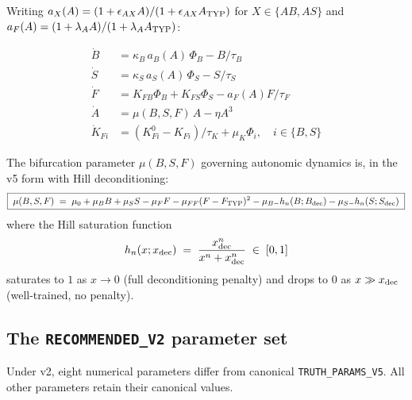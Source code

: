 \documentclass[11pt,a4paper]{article}
\theoremstyle{definition}
\begin{document}
Writing $a_X(A) = (1 + \epsilon_{AX} A)/(1 + \epsilon_{AX} A_{\rm TYP})$ for $X \in \{AB, AS\}$ and $a_F(A) = (1 + \lambda_A A)/(1 + \lambda_A A_{\rm TYP})$:

\begin{align}
\dot B   &= \kappa_B \, a_B(A) \, \Phi_B - B / \tau_B \label{eq:drift-B}\\
\dot S   &= \kappa_S \, a_S(A) \, \Phi_S - S / \tau_S \label{eq:drift-S}\\
\dot F   &= K_{FB} \Phi_B + K_{FS} \Phi_S - a_F(A) F / \tau_F \label{eq:drift-F}\\
\dot A   &= \mu(B, S, F) \, A - \eta A^3 \label{eq:drift-A}\\
\dot K_{Fi} &= (K_{Fi}^0 - K_{Fi}) / \tau_K + \mu_K \Phi_i, \quad i \in \{B, S\} \label{eq:drift-K}
\end{align}

The bifurcation parameter $\mu(B, S, F)$ governing autonomic dynamics is, in the v5 form with Hill deconditioning:
\begin{equation}
\boxed{\;
\mu(B, S, F) \;=\; \mu_0 + \mu_B B + \mu_S S - \mu_F F - \mu_{FF}(F - F_{\rm TYP})^2 - \mu_{B-} h_n(B; B_{\rm dec}) - \mu_{S-} h_n(S; S_{\rm dec})
\;}
\label{eq:mu}
\end{equation}
where the Hill saturation function
\begin{equation}
h_n(x; x_{\rm dec}) \;=\; \frac{x_{\rm dec}^n}{x^n + x_{\rm dec}^n} \;\in\; [0, 1]
\label{eq:hill}
\end{equation}
saturates to $1$ as $x \to 0$ (full deconditioning penalty) and drops to $0$ as $x \gg x_{\rm dec}$ (well-trained, no penalty).

\subsection{The \texttt{RECOMMENDED\_V2} parameter set}

Under v2, eight numerical parameters differ from canonical \texttt{TRUTH\_PARAMS\_V5}. All other parameters retain their canonical values.
\end{document}
